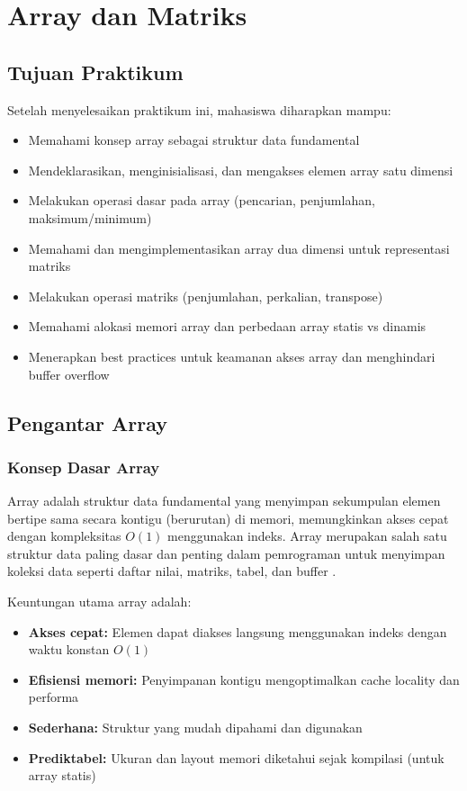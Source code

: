 \documentclass[../main.tex]{subfiles}
\begin{document}
\chapter{Array dan Matriks}

\section*{Tujuan Praktikum}
Setelah menyelesaikan praktikum ini, mahasiswa diharapkan mampu:
\begin{itemize}
  \item Memahami konsep array sebagai struktur data fundamental
  \item Mendeklarasikan, menginisialisasi, dan mengakses elemen array satu dimensi
  \item Melakukan operasi dasar pada array (pencarian, penjumlahan, maksimum/minimum)
  \item Memahami dan mengimplementasikan array dua dimensi untuk representasi matriks
  \item Melakukan operasi matriks (penjumlahan, perkalian, transpose)
  \item Memahami alokasi memori array dan perbedaan array statis vs dinamis
  \item Menerapkan best practices untuk keamanan akses array dan menghindari buffer overflow
\end{itemize}

\section{Pengantar Array}

\subsection{Konsep Dasar Array}
Array adalah struktur data fundamental yang menyimpan sekumpulan elemen bertipe sama secara kontigu (berurutan) di memori, memungkinkan akses cepat dengan kompleksitas \(O(1)\) menggunakan indeks. Array merupakan salah satu struktur data paling dasar dan penting dalam pemrograman untuk menyimpan koleksi data seperti daftar nilai, matriks, tabel, dan buffer \parencite{cpp-reference,free-pascal-docs,iso-c-draft-n1570,tutorialspoint-c-arrays}.

Keuntungan utama array adalah:
\begin{itemize}
  \item \textbf{Akses cepat:} Elemen dapat diakses langsung menggunakan indeks dengan waktu konstan \(O(1)\)
  \item \textbf{Efisiensi memori:} Penyimpanan kontigu mengoptimalkan cache locality dan performa
  \item \textbf{Sederhana:} Struktur yang mudah dipahami dan digunakan
  \item \textbf{Prediktabel:} Ukuran dan layout memori diketahui sejak kompilasi (untuk array statis)
\end{itemize}
\end{document}
